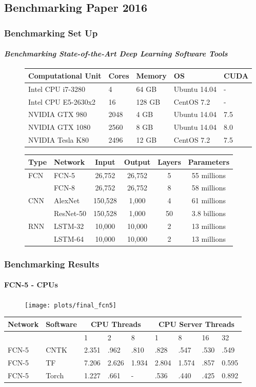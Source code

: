 \documentclass[9pt]{beamer}
\begin{document}
\subsection{Benchmarking Paper 2016}
\begin{frame}
\frametitle{Benchmarking Set Up}
\framesubtitle{\emph{Benchmarking State-of-the-Art Deep Learning Software Tools}}
\begin{figure}
\center
\begin{tabular}{l l l l l}
\hline
Computational Unit & Cores & Memory & OS & CUDA \\ \hline
Intel CPU i7-3280 & 4 & 64 GB & Ubuntu 14.04 & - \\
Intel CPU E5-2630x2 & 16 & 128 GB & CentOS 7.2 & - \\
NVIDIA GTX 980 & 2048 & 4 GB & Ubuntu 14.04 & 7.5 \\
NVIDIA GTX 1080 & 2560 & 8 GB & Ubuntu 14.04 & 8.0 \\
NVIDIA Tesla K80 & 2496 & 12 GB & CentOS 7.2 & 7.5 \\
\hline
\end{tabular}
\end{figure}
\begin{figure}
\center
\begin{tabular}{l | l | c | c | c | c }
\hline
Type & Network & Input & Output & Layers & Parameters \\
\hline
FCN & FCN-5 & 26,752 & 26,752 & 5 & 55 millions \\
 & FCN-8 & 26,752 & 26,752 & 8 & 58 millions \\ 
\hline
CNN & AlexNet & 150,528 &  1,000 & 4 & 61 millions \\
 & ResNet-50 & 150,528 &  1,000 & 50 & 3.8 billions \\ 
\hline
RNN & LSTM-32 & 10,000 & 10,000 & 2 & 13 millions\\
 & LSTM-64 & 10,000 & 10,000 & 2 & 13 millions\\
\hline
\end{tabular}
\end{figure}
\end{frame}

\begin{frame}
\frametitle{Benchmarking Results}
\framesubtitle{FCN-5 - CPUs}
\begin{table}
\begin{figure}
\centering
\texttt{[image: plots/final\_fcn5]}
\end{figure}
\tiny
\begin{tabular}{ |l|l|l|l|l|l|l|l|l| }
  \hline
Network & Software &  \multicolumn{3}{|c|}{CPU Threads} &  \multicolumn{4}{|c|}{CPU Server Threads}\\ \hline
 & & 1 & 2 & 8 & 1 & 8 & 16 & 32\\ \hline \hline
FCN-5 & CNTK & 2.351 & .962 & .810 &.828 & .547 & .530& .549 \\
FCN-5 & TF & 7.206 & 2.626 & 1.934 & 2.804 & 1.574 & .857 & 0.595\\
FCN-5 & Torch & 1.227 & .661 & - & .536 & .440 & .425 & 0.892\\ \hline
\end{tabular}
\end{table}
\end{frame}
\end{document}

